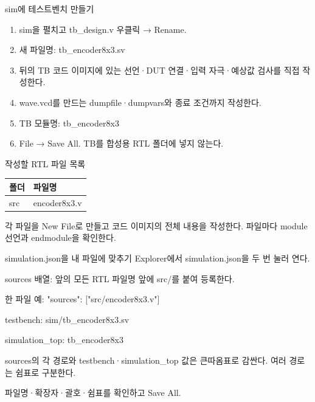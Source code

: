 \begin{frame}{sim에 테스트벤치 만들기}\relax
\small
\begin{enumerate}\setlength{\itemsep}{0.22cm}
\item sim을 펼치고 tb\_design.v 우클릭 → Rename.
\item 새 파일명: tb\_encoder8x3.sv
\item 뒤의 TB 코드 이미지에 있는 선언·DUT 연결·입력 자극·예상값 검사를 직접 작성한다.
\item wave.vcd를 만드는 dumpfile·dumpvars와 종료 조건까지 작성한다.
\item TB 모듈명: tb\_encoder8x3
\item File → Save All. TB를 합성용 RTL 폴더에 넣지 않는다.
\end{enumerate}

\end{frame}

\begin{frame}{작성할 RTL 파일 목록}\relax
\small
\begin{center}\renewcommand{\arraystretch}{1.45}
\begin{tabular}{l|l}
폴더 & 파일명\\\hline
src & encoder8x3.v\\
\end{tabular}\end{center}
각 파일을 New File로 만들고 코드 이미지의 전체 내용을 작성한다. 파일마다 module 선언과 endmodule을 확인한다.\par
\end{frame}

\begin{frame}{simulation.json을 내 파일에 맞추기}\relax
\small
Explorer에서 simulation.json을 두 번 눌러 연다.\par\vspace{0.22cm}sources 배열: 앞의 모든 RTL 파일명 앞에 src/를 붙여 등록한다.\par\vspace{0.22cm}한 파일 예: "sources": ["src/encoder8x3.v"]\par\vspace{0.22cm}testbench: sim/tb\_encoder8x3.sv\par\vspace{0.22cm}simulation\_top: tb\_encoder8x3\par\vspace{0.22cm}sources의 각 경로와 testbench·simulation\_top 값은 큰따옴표로 감싼다. 여러 경로는 쉼표로 구분한다.\par\vspace{0.22cm}파일명·확장자·괄호·쉼표를 확인하고 Save All.\par
\end{frame}

